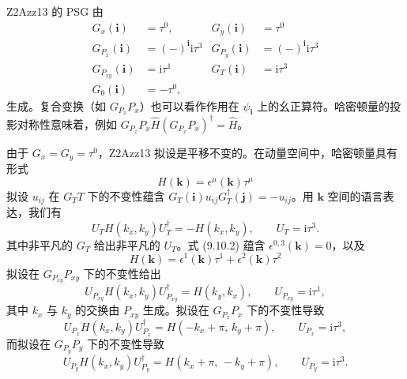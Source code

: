 Z2Azz13 的 PSG 由
\begin{align*}
G_{x}(\pmb{i}) &= \tau^{0}, & G_{y}(\pmb{i}) &= \tau^{0}\\
G_{P_{x}}(\pmb{i}) &= (-)^{\pmb{i}}\mathrm{i}\tau^{3} & G_{P_{y}}(\pmb{i}) &= (-)^{\pmb{i}}\mathrm{i}\tau^{3}\\
G_{P_{xy}}(\pmb{i}) &= \mathrm{i}\tau^{1} & G_{T}(\pmb{i}) &= \mathrm{i}\tau^{3}\\
G_{0}(\pmb{i}) &= -\tau^{0},\tag{9.10.1}
\end{align*}
生成。复合变换（如 $G_{P_{x}}P_{x}$）也可以看作作用在 $\psi_{\pmb{i}}$ 上的幺正算符。哈密顿量的投影对称性意味着，例如 $G_{P_{x}}P_{x}\hat{H}(G_{P_{x}}P_{x})^{\dagger}=\hat{H}$。

由于 $G_{x}=G_{y}=\tau^{0}$，Z2Azz13 拟设是平移不变的。在动量空间中，哈密顿量具有形式
\begin{equation*}
H(\pmb{k})=\epsilon^{\mu}(\pmb{k})\tau^{\mu}
\end{equation*}
拟设 $u_{ij}$ 在 $G_{T}T$ 下的不变性蕴含 $G_{T}(\pmb{i})u_{ij}G_{T}^{\dagger}(\pmb{j})=-u_{ij}$。用 $\pmb{k}$ 空间的语言表达，我们有
\begin{equation*}
U_{T}H(k_{x},k_{y})U_{T}^{\dagger}=-H(k_{x},k_{y}),\qquad U_{T}=\mathrm{i}\tau^{3}.\tag{9.10.2}
\end{equation*}
其中非平凡的 $G_{T}$ 给出非平凡的 $U_{T}$。式 (9.10.2) 蕴含 $\epsilon^{0,3}(\pmb{k})=0$，以及
\begin{equation*}
H(\pmb{k})=\epsilon^{1}(\pmb{k})\tau^{1}+\epsilon^{2}(\pmb{k})\tau^{2}\tag{9.10.3}
\end{equation*}
拟设在 $G_{P_{xy}}P_{xy}$ 下的不变性给出
\begin{equation*}
U_{P_{xy}}H(k_{x},k_{y})U_{P_{xy}}^{\dagger}=H(k_{y},k_{x}),\qquad U_{P_{xy}}=\mathrm{i}\tau^{1},\tag{9.10.4}
\end{equation*}
其中 $k_{x}$ 与 $k_{y}$ 的交换由 $P_{xy}$ 生成。拟设在 $G_{P_{x}}P_{x}$ 下的不变性导致
\begin{equation*}
U_{P_{x}}H(k_{x},k_{y})U_{P_{x}}^{\dagger}=H(-k_{x}+\pi,\,k_{y}+\pi),\qquad U_{P_{x}}=\mathrm{i}\tau^{3},\tag{9.10.5}
\end{equation*}
而拟设在 $G_{P_{y}}P_{y}$ 下的不变性导致
\begin{equation*}
U_{P_{y}}H(k_{x},k_{y})U_{P_{y}}^{\dagger}=H(k_{x}+\pi,\,-k_{y}+\pi),\qquad U_{P_{y}}=\mathrm{i}\tau^{3}.\tag{9.10.6}
\end{equation*}
